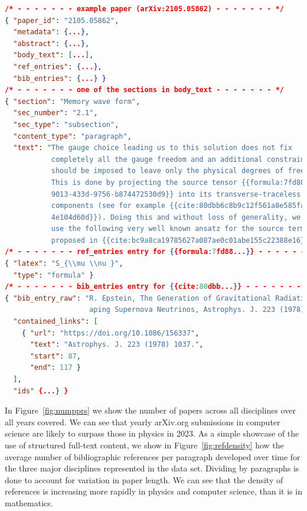 \begin{lstlisting}[language=json,caption=Data example.,label=lst:datasample,breaklines=true,captionpos=b,frame=single,showlines=true,basicstyle=\tiny]
/* - - - - - - - example paper (arXiv:2105.05862) - - - - - - - */
{ "paper_id": "2105.05862",
  "metadata": {...},
  "abstract": {...},
  "body_text": [...],
  "ref_entries": {...},
  "bib_entries": {...} }
/* - - - - - - - one of the sections in body_text - - - - - - - */
{ "section": "Memory wave form",
  "sec_number": "2.1",
  "sec_type": "subsection",
  "content_type": "paragraph",
  "text": "The gauge choice leading us to this solution does not fix
           completely all the gauge freedom and an additional constraint
           should be imposed to leave only the physical degrees of freedom.
           This is done by projecting the source tensor {{formula:7fd88bcd-
           9013-433d-9756-b874472530d9}} into its transverse-traceless (TT)
           components (see for example {{cite:80dbb6c8b9c12f561a8e585faceac5f
           4e104d60d}}). Doing this and without loss of generality, we will
           use the following very well known ansatz for the source term
           proposed in {{cite:bc9a8ca19785627a087ae0c01abe155c22388e16}}\n" }
/* - - - - - - - ref_entries entry for {{formula:7fd88...}} - - - - - - - */
{ "latex": "S_{\\mu \\nu }",
  "type": "formula" }
/* - - - - - - - bib_entries entry for {{cite:80dbb...}} - - - - - - - */
{ "bib_entry_raw": "R. Epstein, The Generation of Gravitational Radiation by Esc
                    aping Supernova Neutrinos, Astrophys. J. 223 (1978) 1037.",
  "contained_links": [
    { "url": "https://doi.org/10.1086/156337",
      "text": "Astrophys. J. 223 (1978) 1037.",
      "start": 87,
      "end": 117 }
  ],
  "ids" {...} }
\end{lstlisting}

In Figure~\ref{fig:numpprs} we show the number of papers across all disciplines over all years covered. We can see that yearly arXiv.org submissions in computer science are likely to surpass those in physics in 2023. As a simple showcase of the use of structured full-text content, we show in Figure~\ref{fig:refdensity} how the average number of bibliographic references per paragraph developed over time for the three major disciplines represented in the data set. Dividing by paragraphs is done to account for variation in paper length. We can see that the density of references is increasing more rapidly in physics and computer science, than it is in mathematics.

